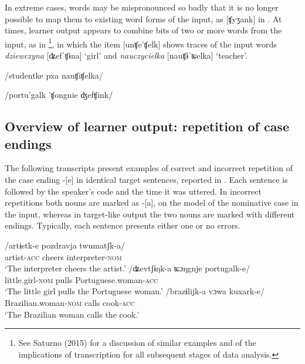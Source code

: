 In extreme cases, words may be mispronounced so badly that it is no longer possible to map them to existing word forms of the input, as [ʧyʒank] in . At times, learner output appears to combine bits of two or more words from the input, as in \footnote{See Saturno (2015) for a discussion of similar examples and of the implications of transcription for all subsequent stages of data analysis.}, in which the item [unʧe'ʧelk] shows traces of the input words \textit{dziewczyna} [ʥefˈʧɨna] ‘girl’ and \textit{nauczycielka} [nauʧɨˈʨelka] ‘teacher’.

\ea%
    \label{ex:04:3}
    /studentke pxa nauʧiʧelka/\\
    [ʧy'ʒank 'pxa unʧe'ʧelk]
    \z

\ea%
    \label{ex:04:4}
    /portu'galk 'ʧongnie ʤefʧink/\\
    [portu'galk 'ʧoni ʧef'ʧelk]
    \z

\subsection{Overview of learner output: repetition of case endings}\label{sec:04:2.2}

The following transcripts present examples of correct  and incorrect  repetition of the case ending -[e] in identical target sentences, reported in . Each sentence is followed by the speaker’s code and the time it was uttered. In incorrect repetitions both nouns are marked as -[a], on the model of the nominative case in the input, whereas in target-like output the two nouns are marked with different endings. Typically, each sentence presents either one or no errors.

\ea%
    \label{ex:04:5}
    \ea\label{ex:04:5a}
    \gll    /artɨstk-e   pozdravja   twumatʃk-a/\\
            artist-\textsc{acc}  cheers    interpreter-\textsc{nom}\\
    \glt    ‘The interpreter cheers the artist.’
    \ex\label{ex:04:5b}
    \gll    /ʥevtʃɨŋk-a  ʨɔŋgnje   portugalk-e/\\
            little.girl-\textsc{nom}  pulls    Portuguese.woman-\textsc{acc}\\
    \glt    ‘The little girl pulls the Portuguese woman.’
    \ex\label{ex:04:5c}
    \gll    /brazɨlijk-a     vɔwa   kuxark-e/\\
            Brazilian.woman-\textsc{nom}  calls  cook-\textsc{acc}\\
    \glt    ‘The Brazilian woman calls the cook.’
    \z
\z


